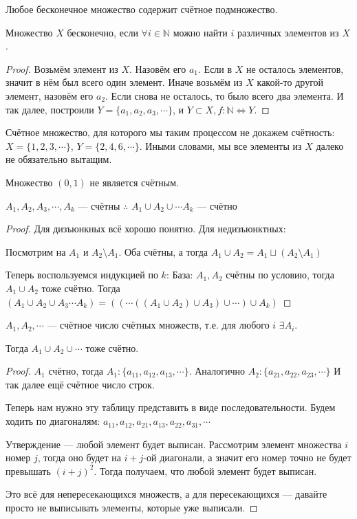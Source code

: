 \begin{theorem}[Лемма]
Любое бесконечное множество содержит счётное подмножество.
\end{theorem}
\begin{definition}
	Множество $X$ бесконечно, если $\forall i \in \mathbb{N}$ можно найти $i$ различных элементов из $X$.
\end{definition}
\begin{proof}
	Возьмём элемент из $X$. Назовём его $a_1$. Если в $X$ не осталось элементов, значит в нём был всего один элемент. Иначе возьмём из $X$ какой-то другой элемент, назовём его $a_2$. Если снова не осталось, то было всего два элемента. И так далее, построили $Y = \{a_1, a_2, a_3, \cdots\}$, и $Y \subset X, f: \mathbb{N} \Leftrightarrow Y$.
\end{proof}
\begin{example}
	Счётное множество, для которого мы таким процессом не докажем счётность: $X = \{1, 2, 3, \cdots\}$, $Y = \{2, 4, 6, \cdots\}$. Иными словами, мы все элементы из $X$ далеко не обязательно вытащим.
\end{example}
\begin{example}
	Множество $(0, 1)$ не является счётным.
\end{example}
\begin{consequence}
$A_1, A_2, A_3, \cdots, A_k$ --- счётны $\therefore$ $A_1 \cup A_2 \cup \cdots A_k$ --- счётно
\end{consequence}
\begin{proof}
    Для дизъюнкных всё хорошо понятно. Для недизъюнктных:

    Посмотрим на $A_1$ и $A_2 \setminus A_1$. Оба счётны, а тогда $A_1 \cup A_2 = A_1 \sqcup (A_2 \setminus A_1)$

    Теперь воспользуемся индукцией по $k$:
    База: $A_1, A_2$ счётны по условию, тогда $A_1 \cup A_2$ тоже счётно.
    Тогда $(A_1 \cup A_2 \cup A_3 \cdots A_k) = ((\cdots((A_1 \cup A_2) \cup A_3) \cup \cdots) \cup A_k)$
\end{proof}
\begin{lemma}
$A_1, A_2, \cdots$ --- счётное число счётных множеств, т.е. для любого $i$ $\exists A_i$.

Тогда $A_1 \cup A_2 \cup \cdots$ тоже счётно.
\end{lemma}
\begin{proof}
	$A_1$ счётно, тогда $A_1: \{a_{11}, a_{12}, a_{13}, \cdots\}$. 
	Аналогично $A_2: \{a_{21}, a_{22}, a_{23}, \cdots\}$
	И так далее ещё счётное число строк.

	Теперь нам нужно эту таблицу представить в виде последовательности.
	Будем ходить по диагоналям: $a_{11}, a_{12}, a_{21}, a_{13}, a_{22}, a_{31}, \cdots$

	Утверждение --- любой элемент будет выписан. Рассмотрим элемент множества $i$ номер $j$, тогда оно будет на $i+j$-ой диагонали, а значит его номер точно не будет превышать $(i+j)^2$. Тогда получаем, что любой элемент будет выписан.

	Это всё для непересекающихся множеств, а для пересекающихся --- давайте просто не выписывать элементы, которые уже выписали. 
\end{proof}

